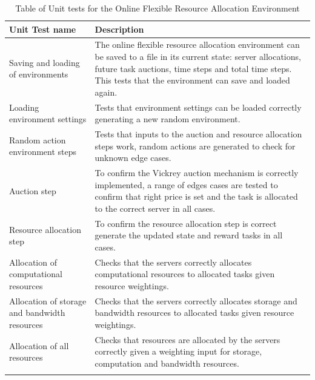 \begin{longtable}{|p{3cm}|p{11cm}|} \hline
    \textbf{Unit Test name} & \textbf{Description} \\ \hline
    Saving and loading of environments & The online flexible resource allocation environment can be saved to a
        file in its current state: server allocations, future task auctions, time steps and total time steps. This
        tests that the environment can save and loaded again. \\ \hline
    Loading environment settings & Tests that environment settings can be loaded correctly generating a new random
        environment. \\ \hline
    Random action environment steps & Tests that inputs to the auction and resource allocation steps work,
        random actions are generated to check for unknown edge cases.  \\ \hline
    Auction step & To confirm the Vickrey auction mechanism is correctly implemented, a range of edges cases
        are tested to confirm that right price is set and the task is allocated to the correct server in all cases.
        \\ \hline
    Resource allocation step & To confirm the resource allocation step is correct generate the updated state and reward
        tasks in all cases.
        \\ \hline
    Allocation of computational resources & Checks that the servers correctly allocates computational resources to
        allocated tasks given resource weightings. \\ \hline
    Allocation of storage and bandwidth resources & Checks that the servers correctly allocates storage and
        bandwidth resources to allocated tasks given resource weightings. \\ \hline
    Allocation of all resources & Checks that resources are allocated by the servers correctly given a weighting
        input for storage, computation and bandwidth resources. \\ \hline
    \caption{Table of Unit tests for the Online Flexible Resource Allocation Environment}
    \label{tab:environment-unit-tests}
\end{longtable}


